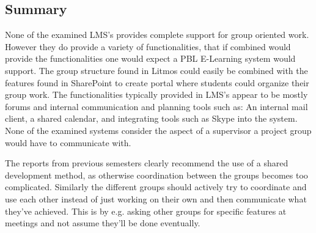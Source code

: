 \documentclass[a4paper,10pt]{article}
\begin{document}
\subsection{Summary}
None of the examined LMS's provides complete support for group oriented work.
However they do provide a variety of functionalities, that if combined would provide the functionalities one would expect a PBL E-Learning system would support.
The group structure found in Litmos could easily be combined with the features found in SharePoint to create portal where students could organize their group work.
The functionalities typically provided in LMS's appear to be mostly forums and internal communication and planning tools such as: An internal mail client, a shared calendar, and integrating tools such as Skype into the system.
None of the examined systems consider the aspect of a supervisor a project group would have to communicate with.

The reports from previous semesters clearly recommend the use of a shared development method, as otherwise coordination between the groups becomes too complicated. Similarly the different groups should actively try to coordinate and use each other instead of just working on their own and then communicate what they've achieved. This is by e.g. asking other groups for specific features at meetings and not assume they'll be done eventually.
\end{document}
